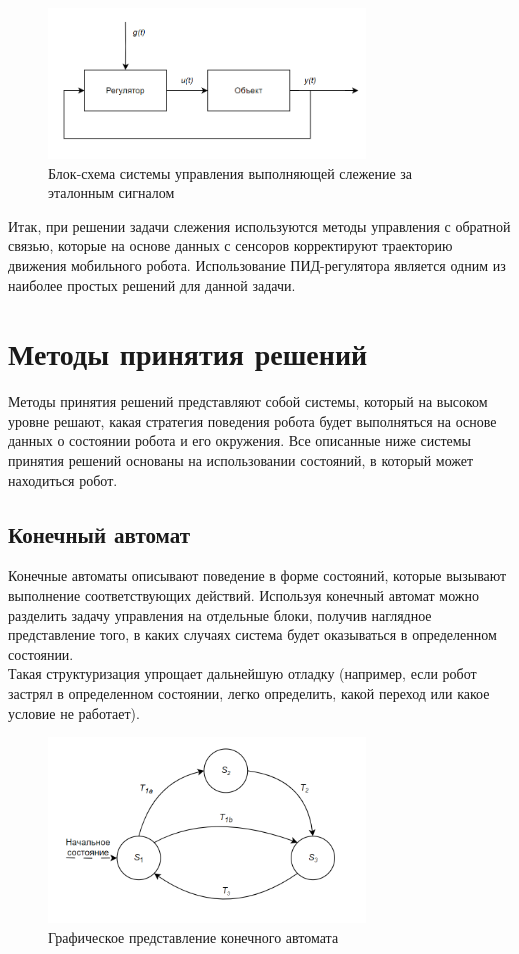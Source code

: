 \begin{figure}[h]
    \centering
    \includegraphics[width=0.75\textwidth]{images/chap_1/tracking_scheme.png}
    \caption{Блок-схема системы управления выполняющей слежение за эталонным сигналом}
    \label{fig:tracking_scheme}
\end{figure}

Итак, при решении задачи слежения используются методы управления с обратной связью, которые на основе данных с сенсоров корректируют траекторию движения мобильного робота. Использование ПИД-регулятора является одним из наиболее простых решений для данной задачи. 

\section{Методы принятия решений}
Методы принятия решений представляют собой системы, который на высоком уровне решают, какая стратегия поведения робота будет выполняться на основе данных о состоянии робота и его окружения. Все описанные ниже системы принятия решений основаны на использовании состояний, в который может находиться робот. 

\subsection{Конечный автомат}
Конечные автоматы описывают поведение в форме состояний, которые вызывают выполнение соответствующих действий. Используя конечный автомат можно разделить задачу управления на отдельные блоки, получив наглядное представление того, в каких случаях система будет оказываться в определенном состоянии. \\
Такая структуризация упрощает дальнейшую отладку (например, если робот застрял в определенном состоянии, легко определить, какой переход или какое условие не работает). 

\begin{figure}[h]
    \centering
    \includegraphics[width=0.75\textwidth]{images/chap_1/fms.png}
    \caption{Графическое представление конечного автомата}
    \label{fig:fms}
\end{figure}

